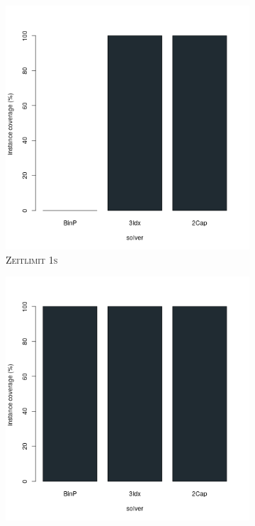 \begin{figure}[H]
\centering

\begin{subfigure}[b]{0.3\textwidth}
\centering
\includegraphics[width=1.2\textwidth]{img/solver_instance_coverage_b=2_s_1s.png}
\caption{\textsc{Zeitlimit 1s}}
\label{fig:instance_cov_b=2_s_a}
\end{subfigure}
\hfill
\begin{subfigure}[b]{0.3\textwidth}
\centering
\includegraphics[width=1.2\textwidth]{img/solver_instance_coverage_b=2_s_3s.png}

\end{subfigure}
\end{figure}

